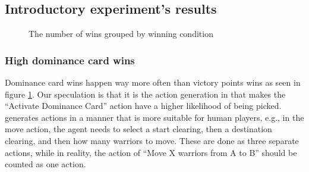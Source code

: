 \subsection{Introductory experiment's results}

\begin{figure}
    \centering
    \caption{The number of wins grouped by winning condition}
    \label{fig:wins-by-winner-condition}
\end{figure}

\subsubsection{High dominance card wins} \label{high-dominance-card-wins}
Dominance card wins happen way more often than victory points wins as seen in figure \ref{fig:wins-by-winner-condition}. Our speculation is that it is the action generation in \RootOurs{} that makes the ``Activate Dominance Card'' action have a higher likelihood of being picked. \RootOurs{} generates actions in a manner that is more suitable for human players, e.g., in the move action, the agent needs to select a start clearing, then a destination clearing, and then how many warriors to move. These are done as three separate actions, while in reality, the action of ``Move X warriors from A to B'' should be counted as one action.

